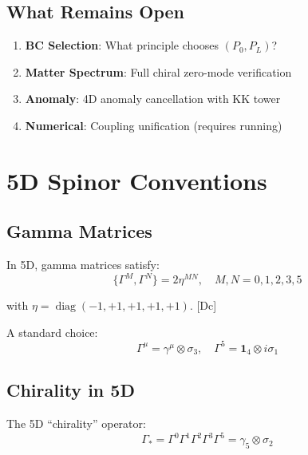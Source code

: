 \documentclass[11pt,a4paper]{article}
\newcommand{\tagDc}{\textcolor{blue!50!black}{[Dc]}}
\DeclareMathOperator{\diag}{diag}
\begin{document}
\subsection{What Remains Open}

\begin{enumerate}
    \item \textbf{BC Selection}: What principle chooses $(P_0, P_L)$?
    \item \textbf{Matter Spectrum}: Full chiral zero-mode verification
    \item \textbf{Anomaly}: 4D anomaly cancellation with KK tower
    \item \textbf{Numerical}: Coupling unification (requires running)
\end{enumerate}

\appendix

\section{5D Spinor Conventions}
\label{app:spinor}

\subsection{Gamma Matrices}

In 5D, gamma matrices satisfy:
\begin{equation}
\label{eq:cliff5}
\{\Gamma^M, \Gamma^N\} = 2 \eta^{MN}, \quad M, N = 0, 1, 2, 3, 5
\end{equation}

with $\eta = \diag(-1, +1, +1, +1, +1)$. \tagDc

A standard choice:
\begin{equation}
\label{eq:gamma5d}
\Gamma^\mu = \gamma^\mu \otimes \sigma_3, \quad
\Gamma^5 = \mathbf{1}_4 \otimes i\sigma_1
\end{equation}

\subsection{Chirality in 5D}

The 5D ``chirality'' operator:
\begin{equation}
\label{eq:gamma5-5d}
\Gamma_* = \Gamma^0 \Gamma^1 \Gamma^2 \Gamma^3 \Gamma^5 = \gamma_5 \otimes \sigma_2
\end{equation}
\end{document}
